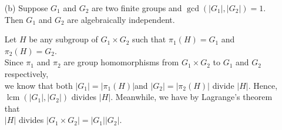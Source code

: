 \documentclass{book}
\newcommand{\HexOne}{%
   \color{Purple}%
   \fontsize{12}{13}\selectfont%
}
\newenvironment{myIndent}{%
   \begin{adjustwidth}{2.5em}{0em}%
}{%
   \end{adjustwidth}%
}
\DeclareMathOperator{\lcm}{lcm}
\newcommand{\retTwo}{\hfill\bigbreak}
\begin{document}
\begin{enumerate}
\begin{myIndent}
\begin{myIndent}
\begin{itemize}
				{\centering$N_2 = \phi(N_1) = \phi(g_1^{-1}g_1 N_1) = \phi(g_1^{-1} N_1)\phi(g_1 N_1) = \phi(g_1^{-1} N_1) g_2N_2$.\retTwo\par}

				Therefore $\phi(g_1^{-1}N_1) = (g_2N_2)^{-1} = g_2^{-1} N_2$ and we've shown that\\ $(g_1, g_2) \in H$.\\ [-6pt]

				\item Suppose $(g_1, g_2), (g_1^\prime, g_2^\prime) \in H$. Then we have that $\phi(g_1N_1) = g_2N_2$ and\\ $\phi(g_1^\prime N_1) = g_2^\prime N_2$. And since $\phi$ is a group homomorphism, we get that:
				
				{\centering $\phi(g_1g_1^\prime N_1) \phi(g_1 N_1)\phi(g_1^\prime N_1) = (g_2N_2)(g_2^\prime N_2) = g_2g_2^\prime N_2$. \retTwo\par}

				This shows that $(g_1g_1^\prime, g_2g_2^\prime) \in H$.\retTwo
			\end{itemize}
		\end{myIndent}

		Next observe that $\pi_1(H) = G_1$. After all, for any $g_1 \in G_1$ we can just pick\\ [1pt] $g_2 \in \phi(g_1 N)$ and then we'll know that $(g_1, g_2) \in H$. We also know that\\ [1pt] $\pi_2(H) = G_2$. After all, since $\phi$ is surjective, we know that for any $g_2 \in G_2$\\ [1pt] there exists a coset $g_1^\prime N_1 \in G_1/N_1$ such that $\phi(g_1^\prime N_1) = g_2N_2$. And now by\\ [1pt] just choosing any $g_1 \in g_1^\prime N_1$ we get that $(g_1, g_2) \in H$.\retTwo

		That said, $H \neq G_1 \times G_2$. To see this, just pick any $g_1 \in N_1$ and $g_2 \notin N_2$.\\ Then $\phi(g_1 N_1) \neq g_2N_2$ and we have that $(g_1, g_2) \notin H$. $\blacksquare$\retTwo
	\end{myIndent}
	
	\item[(b)] Suppose $G_1$ and $G_2$ are two finite groups and $\gcd(|G_1|, |G_2|) = 1$. Then $G_1$ and $G_2$ are algebraically independent.
	
	\begin{myIndent}\HexOne
		Let $H$ be any subgroup of $G_1 \times G_2$ such that $\pi_1(H) = G_1$ and $\pi_2(H) = G_2$.\\ [2pt] Since $\pi_1$ and $\pi_2$ are group homomorphisms from $G_1 \times G_2$ to $G_1$ and $G_2$ respectively,\\ [2pt] we know that both $|G_1| = |\pi_1(H)|$and $|G_2| = |\pi_2(H)|$ divide $|H|$. Hence,\\ [2pt] $\lcm(|G_1|, |G_2|)$ divides $|H|$. Meanwhile, we have by Lagrange's theorem that\\ [2pt] $|H|$ divides $|G_1 \times G_2| = |G_1||G_2|$.\retTwo


\end{myIndent}
\end{enumerate}
\end{document}
